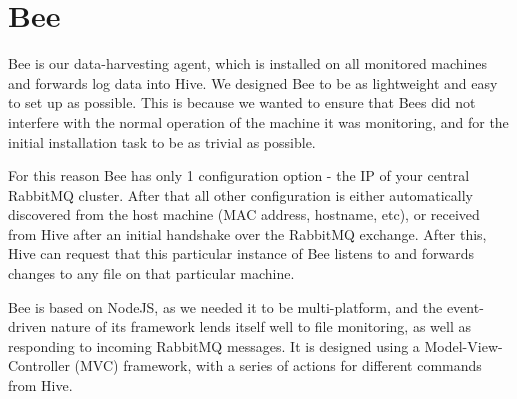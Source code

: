 \section{Bee}

Bee is our data-harvesting agent, which is installed on all monitored machines
and forwards log data into Hive. We designed Bee to be as lightweight and easy
to set up as possible. This is because we wanted to ensure that Bees did not
interfere with the normal operation of the machine it was monitoring, and for
the initial installation task to be as trivial as possible.

For this reason Bee has only 1 configuration option - the IP of your central
RabbitMQ cluster. After that all other configuration is either automatically
discovered from the host machine (MAC address, hostname, etc), or received from
Hive after an initial handshake over the RabbitMQ exchange. After this, Hive can
request that this particular instance of Bee listens to and forwards changes to
any file on that particular machine.

Bee is based on NodeJS\cite{node}, as we needed it to be multi-platform, and the
event-driven nature of its framework lends itself well to file monitoring, as
well as responding to incoming RabbitMQ messages. It is designed using a
Model-View-Controller (MVC) framework, with a series of actions for different
commands from Hive.

